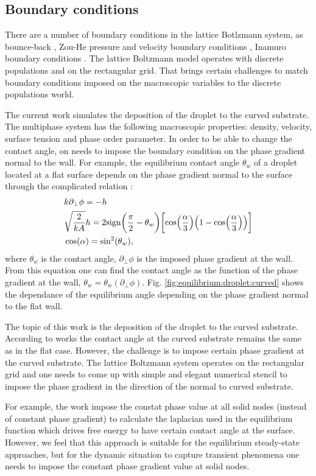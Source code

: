 \documentclass{article}
\newcommand{\beqal}{\begin{equation}\begin{aligned}}
\newcommand{\feqal}{\end{aligned}\end{equation}}
\begin{document}
\subsection{Boundary conditions}
There are a number of boundary conditions in the lattice Botlzmann system, as bounce-back \cite{yu}, Zou-He pressure and velocity boundary conditions \cite{zouhe-boundary}, Inamuro boundary conditions \cite{inamuro-scalar-boundary}. The lattice Boltzmann model operates with discrete populations and on the rectangular grid. That brings certain challenges to match boundary conditions imposed on the macroscopic variables to the discrete populations world.

The current work simulates the deposition of the droplet to the curved substrate. The multiphase system has the following macroscopic properties: density, velocity, surface tension and phase order parameter.  In order to be able to change the contact angle, on needs to impose the boundary condition on the phase gradient normal to the wall. For example, the equilibrium contact angle $\theta_{w}$ of a droplet located at a flat surface depends on the phase gradient normal to the surface through the complicated relation \cite{briant-contact-line}:
\beqal
&k \partial_{\perp} \phi = -h\\
&\sqrt{\frac{2}{k A}}h= 2 \mathrm{sign}\biggl(\frac{\pi}{2}-\theta_w\biggr) \biggl[\cos\Bigl(\frac{\alpha}{3}\Bigr)\Bigl(1-\cos\Bigl(\frac{\alpha}{3}\Bigr)\Bigr)\biggr]\\
&\cos(\alpha)=\sin^2(\theta_w),
\feqal
where $\theta_w$ is the contact angle, $\partial_{\perp}\phi$ is the imposed phase gradient at the wall. From this equation one can find the contact angle as the function of the phase gradient at the wall, $\theta_w=\theta_w(\partial_{\perp}\phi)$. Fig.  \ref{fig:equilibrium:droplet:curved} shows the dependance of the equilibrium angle depending on the phase gradient normal to the flat wall. 

The topic of this work is the deposition of the droplet to the curved substrate.  According to works \cite{manukyan-curved,carroll-curved} the contact angle at the curved substrate remains the same as in the flat case. However, the challenge is to impose certain phase gradient at the curved substrate. The lattice Boltzmann system operates on the rectangular grid and one needs to come up with simple and elegant numerical stencil to impose the phase gradient in the direction of the normal to curved substrate.  

For example, the work \cite{japan-curved} impose the constat phase value at all solid nodes (instead of constant phase gradient) to calculate the laplacian used in the equilibrium function which drives free energy to have certain contact angle at the surface. However, we feel that this approach is suitable for the equilibrium steady-state approaches, but for the dynamic situation to capture transient phenomena one needs to impose the constant phase gradient value at solid nodes.
\end{document}
